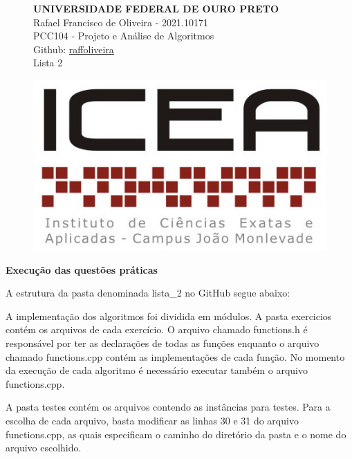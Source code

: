 \documentclass[12pt,a4paper]{article}
\begin{document}
\begin{figure}[H]
\begin{minipage}[]{0.07\linewidth}
	\end{minipage}
\hfill
	\begin{minipage}[]{0.6\linewidth}
		\centering
	\textbf{UNIVERSIDADE FEDERAL DE OURO PRETO\\}
		Rafael Francisco de Oliveira - 2021.10171\\
		PCC104 - Projeto e Análise de Algoritmos\\
		Github: \href{https://github.com/raffoliveira/Master_Degree}{raffoliveira}\\
		Lista 2
		
	\end{minipage}
\hfill	
	\begin{minipage}[c]{0.15\linewidth}
	\includegraphics[width=\linewidth]{images/icea.jpg}	
	\end{minipage}

\vspace{0.5cm}
\hrulefill
\end{figure}

{\Large \textbf{Execução das questões práticas}}

\vspace{0.5cm}

A estrutura da pasta denominada \textsf{lista\_2} no GitHub segue abaixo:

A implementação dos algoritmos foi dividida em módulos. A pasta \textsf{exercicios} contém os arquivos de cada exercício. O arquivo chamado \textsf{functions.h} é responsável por ter as declarações de todas as funções enquanto o arquivo chamado \textsf{functions.cpp} contém as implementações de cada função. No momento da execução de cada algoritmo é necessário executar também o arquivo \textsf{functions.cpp}.

A pasta \textsf{testes} contém os arquivos contendo as instâncias para testes. Para a escolha de cada arquivo, basta modificar as linhas \textsf{30} e \textsf{31} do arquivo \textsf{functions.cpp}, as quais especificam o caminho do diretório da pasta e o nome do arquivo escolhido.
\end{document}
